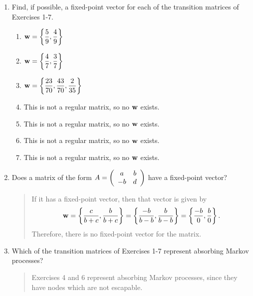 \documentclass{hw}
\begin{document}
\begin{enumerate}
\item Find, if possible, a fixed-point vector for each of the transition matrices of Exercises 1-7.
\begin{multicols}{2}
\begin{enumerate}
\item $\displaystyle \mathbf{w}=\left\{{5\over9}, {4\over9}\right\}$
\item $\displaystyle \mathbf{w}=\left\{{4\over7}, {3\over7}\right\}$
\item $\displaystyle \mathbf{w}=\left\{{23\over70}, {43\over70}, {2\over35}\right\}$
\item This is not a regular matrix, so no $\bf{w}$ exists.
\item This is not a regular matrix, so no $\bf{w}$ exists.
\item This is not a regular matrix, so no $\bf{w}$ exists.
\item This is not a regular matrix, so no $\bf{w}$ exists.
\end{enumerate}
\end{multicols}

\item Does a matrix of the form
$\displaystyle A=\left(\begin{array}{c c}a & b \\ -b & d\end{array}\right)$ have a fixed-point vector?
\begin{quote}
If it has a fixed-point vector, then that vector is given by
\[
\mathbf{w}=\left\{ {c\over b+c},{b\over b+c} \right\}
= \left\{ {-b\over b-b},{b\over b-b}\right\}
= \left\{ {-b\over 0},{b\over 0}\right\}.
\]
Therefore, there is no fixed-point vector for the matrix.
\end{quote}

\setcounter{enumi}{31}
\item Which of the transition matrices of Exercises 1-7 represent absorbing Markov processes?
\begin{quote}
Exercises 4 and 6 represent absorbing Markov processes, since they have nodes which are not
escapable.
\end{quote}
\end{enumerate}
\end{document}
